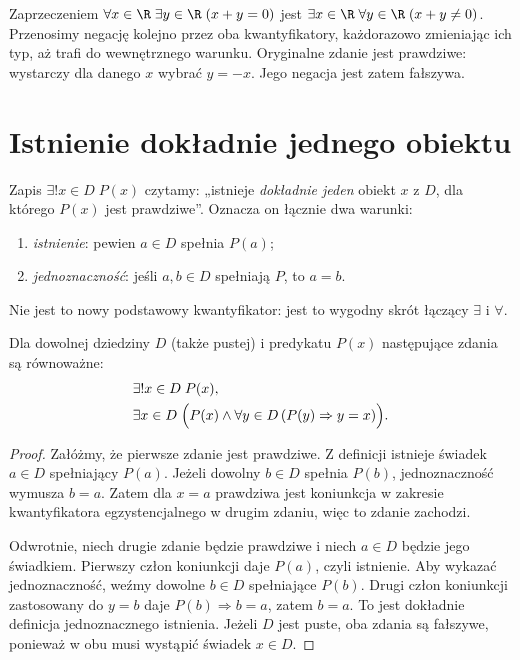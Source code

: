 \begin{przyklad}
Zaprzeczeniem
$\forall x\in\R\;\exists y\in\R\;(x+y=0)$
jest
$\exists x\in\R\;\forall y\in\R\;(x+y\ne0)$.
Przenosimy negację kolejno przez oba kwantyfikatory,
każdorazowo zmieniając ich typ, aż trafi do
wewnętrznego warunku. Oryginalne zdanie jest
prawdziwe: wystarczy dla danego $x$ wybrać $y=-x$.
Jego negacja jest zatem fałszywa.
\end{przyklad}

\section{Istnienie dokładnie jednego obiektu}\label{sec:unique-existence}
\begin{definicja}
\label{def:unique}
Zapis $\exists!x\in D\;P(x)$ czytamy:
„istnieje \emph{dokładnie jeden} obiekt $x$ z $D$,
dla którego $P(x)$ jest prawdziwe”. Oznacza on
łącznie dwa warunki:
\begin{enumerate}[label=(\roman*)]
\item \emph{istnienie}: pewien $a\in D$ spełnia $P(a)$;
\item \emph{jednoznaczność}: jeśli $a,b\in D$ spełniają
      $P$, to $a=b$.
\end{enumerate}
Nie jest to nowy podstawowy kwantyfikator: jest to
wygodny skrót łączący $\exists$ i $\forall$.
\end{definicja}

\begin{twierdzenie}
\label{thm:unique-expansion-xli}
Dla dowolnej dziedziny $D$ (także pustej) i predykatu
$P(x)$ następujące zdania są równoważne:
\begin{align*}
&\exists!x\in D\;P(x),\\
&\exists x\in D\;\Bigl(P(x)\land
  \forall y\in D\,(P(y)\Rightarrow y=x)\Bigr).
\end{align*}
\end{twierdzenie}
\begin{proof}
Załóżmy, że pierwsze zdanie jest prawdziwe.
Z definicji istnieje świadek $a\in D$ spełniający $P(a)$.
Jeżeli dowolny $b\in D$ spełnia $P(b)$, jednoznaczność
wymusza $b=a$. Zatem dla $x=a$ prawdziwa jest
koniunkcja w zakresie kwantyfikatora egzystencjalnego
w drugim zdaniu, więc to zdanie zachodzi.

Odwrotnie, niech drugie zdanie będzie prawdziwe
i niech $a\in D$ będzie jego świadkiem.
Pierwszy człon koniunkcji daje $P(a)$, czyli istnienie.
Aby wykazać jednoznaczność, weźmy dowolne $b\in D$
spełniające $P(b)$. Drugi człon koniunkcji zastosowany
do $y=b$ daje $P(b)\Rightarrow b=a$, zatem $b=a$.
To jest dokładnie definicja jednoznacznego istnienia.
Jeżeli $D$ jest puste, oba zdania są fałszywe,
ponieważ w obu musi wystąpić świadek $x\in D$.
\end{proof}

